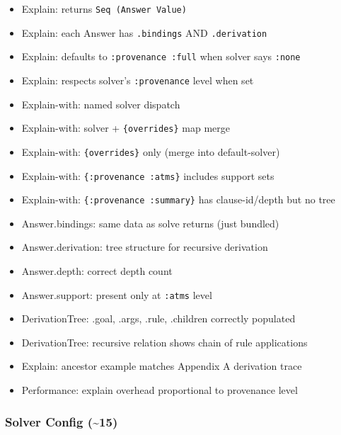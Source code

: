 \documentclass[11pt]{article}
\begin{document}
\begin{itemize}
\item Explain: returns \texttt{Seq (Answer Value)}
\item Explain: each Answer has \texttt{.bindings} AND \texttt{.derivation}
\item Explain: defaults to \texttt{:provenance :full} when solver says \texttt{:none}
\item Explain: respects solver's \texttt{:provenance} level when set
\item Explain-with: named solver dispatch
\item Explain-with: solver + \texttt{\{overrides\}} map merge
\item Explain-with: \texttt{\{overrides\}} only (merge into default-solver)
\item Explain-with: \texttt{\{:provenance :atms\}} includes support sets
\item Explain-with: \texttt{\{:provenance :summary\}} has clause-id/depth but no tree
\item Answer.bindings: same data as solve returns (just bundled)
\item Answer.derivation: tree structure for recursive derivation
\item Answer.depth: correct depth count
\item Answer.support: present only at \texttt{:atms} level
\item DerivationTree: .goal, .args, .rule, .children correctly populated
\item DerivationTree: recursive relation shows chain of rule applications
\item Explain: ancestor example matches Appendix A derivation trace
\item Performance: explain overhead proportional to provenance level
\end{itemize}
\subsubsection{Solver Config (\textasciitilde{}15)}
\label{sec:org1462f22}
\end{document}
